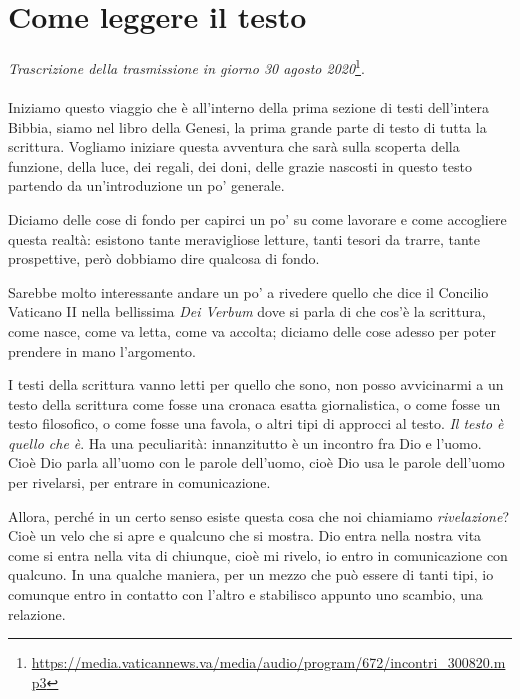 
\chapter{Come leggere il testo}

\textit{Trascrizione della trasmissione in giorno 30 agosto 2020}\footnote{\url{https://media.vaticannews.va/media/audio/program/672/incontri_300820.mp3}}.
\\\\
Iniziamo questo viaggio che è all'interno della prima sezione di testi dell'intera Bibbia, siamo nel libro della Genesi, la prima grande parte di testo di tutta la scrittura. Vogliamo iniziare questa avventura che sarà sulla scoperta della funzione, della luce, dei regali, dei doni, delle grazie nascosti in questo testo partendo da un'introduzione un po' generale. 

Diciamo delle cose di fondo per capirci un po' su come lavorare e come accogliere questa realtà: esistono tante meravigliose letture, tanti tesori da trarre, tante prospettive, però dobbiamo dire qualcosa di fondo. 

Sarebbe molto interessante andare un po' a rivedere quello che dice il Concilio Vaticano II nella bellissima \textit{Dei Verbum} dove si parla di che cos'è la scrittura, come nasce, come va letta, come va accolta; diciamo delle cose adesso per poter prendere in mano l'argomento.

I testi della scrittura vanno letti per quello che sono, non posso avvicinarmi a un testo della scrittura come fosse una cronaca esatta giornalistica, o come fosse un testo filosofico, o come fosse una favola, o altri tipi di approcci al testo. \textit{Il testo è quello che è}. Ha una peculiarità: innanzitutto è un incontro fra Dio e l'uomo. Cioè Dio parla all'uomo con le parole dell'uomo, cioè Dio usa le parole dell'uomo per rivelarsi, per entrare in comunicazione.

Allora, perché in un certo senso esiste questa cosa che noi chiamiamo \textit{rivelazione}? Cioè un velo che si apre e qualcuno che si mostra. Dio entra nella nostra vita come si entra nella vita di chiunque, cioè mi rivelo, io entro in comunicazione con qualcuno. In una qualche maniera, per un mezzo che può essere di tanti tipi, io comunque entro in contatto con l'altro e stabilisco appunto uno scambio, una relazione.

\newpage


